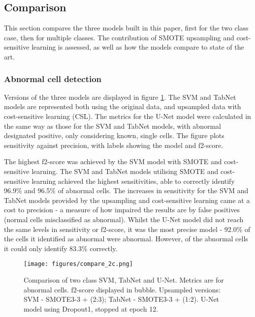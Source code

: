 \documentclass[final,5p,times,twocolumn,authoryear]{elsarticle}
\begin{document}
\subsection{Comparison}
\label{sec:comparison}

This section compares the three models built in this paper, first for the two class case, then for multiple classes. The contribution of SMOTE upsampling and cost-sensitive learning is assessed, as well as how the models compare to state of the art.

\subsubsection{Abnormal cell detection}
\label{subsec:comparison2}

Versions of the three models are displayed in figure \ref{fig:2c_compare}. The SVM and TabNet models are represented both using the original data, and upsampled data with cost-sensitive learning (CSL). The metrics for the U-Net model were calculated in the same way as those for the SVM and TabNet models, with abnormal designated positive, only considering known, single cells. The figure plots sensitivity against precision, with labels showing the model and f2-score. 

The highest f2-score was achieved by the SVM model with SMOTE and cost-sensitive learning.  The SVM and TabNet models utilising SMOTE and cost-sensitive learning achieved the highest sensitivities, able to correctly identify 96.9\% and 96.5\% of abnormal cells. The increases in sensitivity for the SVM and TabNet models provided by the upsampling and cost-sensitive learning came at a cost to precision - a measure of how impaired the results are by false positives (normal cells misclassified as abnormal). Whilst the U-Net model did not reach the same levels in sensitivity or f2-score, it was the most precise model - 92.0\% of the cells it identified as abnormal were abnormal. However, of the abnormal cells it could only identify 83.3\% correctly.


\begin{figure}[t!]
	\centering
	\texttt{[image: figures/compare\_2c.png]}
	\caption[Comparison of two class model metrics]{Comparison of two class SVM, TabNet and U-Net. Metrics are for abnormal cells. f2-score displayed in bubble. Upsampled versions: SVM - SMOTE3-3 + (2:3); TabNet - SMOTE3-3 + (1:2). U-Net model using Dropout1, stopped at epoch 12.}
	\label{fig:2c_compare}
\end{figure}
\end{document}
